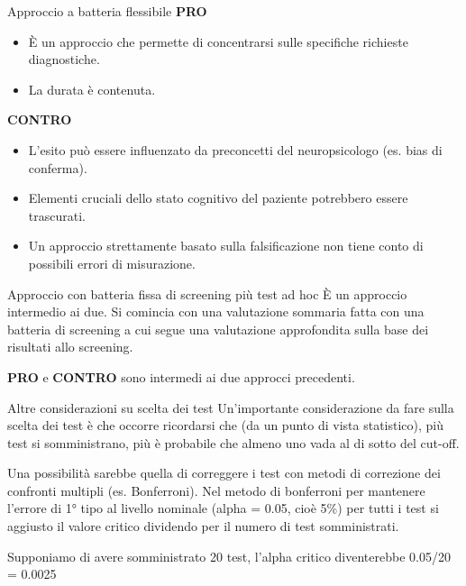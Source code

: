 \documentclass[
  ignorenonframetext,
]{beamer}
\providecommand{\tightlist}{%
  \setlength{\itemsep}{0pt}\setlength{\parskip}{0pt}}
\begin{document}
\begin{frame}{Approccio a batteria flessibile}
\label{approccio-a-batteria-flessibile-2}
\textbf{PRO}

\begin{itemize}
\tightlist
\item
  È un approccio che permette di concentrarsi sulle specifiche richieste
  diagnostiche.
\item
  La durata è contenuta.
\end{itemize}

\textbf{CONTRO}

\begin{itemize}
\tightlist
\item
  L'esito può essere influenzato da preconcetti del neuropsicologo (es.
  bias di conferma).
\item
  Elementi cruciali dello stato cognitivo del paziente potrebbero essere
  trascurati.
\item
  Un approccio strettamente basato sulla falsificazione non tiene conto
  di possibili errori di misurazione.
\end{itemize}
\end{frame}

\begin{frame}{Approccio con batteria fissa di screening più test ad hoc}
\label{approccio-con-batteria-fissa-di-screening-piuxf9-test-ad-hoc}
È un approccio intermedio ai due. Si comincia con una valutazione
sommaria fatta con una batteria di screening a cui segue una valutazione
approfondita sulla base dei risultati allo screening.

\textbf{PRO} e \textbf{CONTRO} sono intermedi ai due approcci
precedenti.
\end{frame}

\begin{frame}{Altre considerazioni su scelta dei test}
\label{altre-considerazioni-su-scelta-dei-test}
Un'importante considerazione da fare sulla scelta dei test è che occorre
ricordarsi che (da un punto di vista statistico), più test si
somministrano, più è probabile che almeno uno vada al di sotto del
cut-off.

Una possibilità sarebbe quella di correggere i test con metodi di
correzione dei confronti multipli (es. Bonferroni). Nel metodo di
bonferroni per mantenere l'errore di 1° tipo al livello nominale (alpha
= 0.05, cioè 5\%) per tutti i test si aggiusto il valore critico
dividendo per il numero di test somministrati.

Supponiamo di avere somministrato 20 test, l'alpha critico diventerebbe
0.05/20 = 0.0025
\end{frame}
\end{document}
